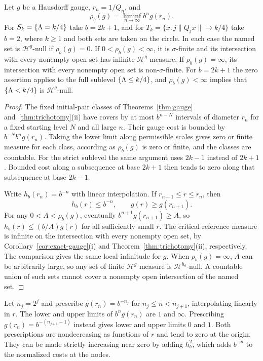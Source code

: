 \begin{corollary}\label{cor:liminf-gauges}
Let $g$ be a Hausdorff gauge, $r_n=1/Q_n$, and
\[
\rho_b(g)=\liminf_{n\to\infty} b^n g(r_n).
\]
For $S_k=\{\Lambda=k/4\}$ take $b=2k+1$, and for
$T_k=\{x:j\|Q_jx\|\to k/4\}$ take $b=2$, where $k\ge1$ and both sets
are taken on the circle. In each case the named set is
$\mathcal H^g$-null if $\rho_b(g)=0$. If $0<\rho_b(g)<\infty$, it is
$\sigma$-finite and its intersection with every nonempty open set has
infinite $\mathcal H^g$ measure. If $\rho_b(g)=\infty$, its intersection
with every nonempty open set is non-$\sigma$-finite. For $b=2k+1$ the
zero assertion applies to the full sublevel $\{\Lambda\le k/4\}$, and
$\rho_b(g)<\infty$ implies that $\{\Lambda<k/4\}$ is $\mathcal H^g$-null.
\end{corollary}

\begin{proof}
The fixed initial-pair classes of Theorems~\ref{thm:gauge}
and~\ref{thm:trichotomy}(ii) have covers by at most $b^{n-N}$ intervals
of diameter $r_n$ for a fixed starting level $N$ and all large $n$.
Their gauge cost is bounded by $b^{-N}b^n g(r_n)$. Taking the lower
limit along permissible scales gives zero or finite measure for each
class, according as $\rho_b(g)$ is zero or finite, and the classes are
countable. For the strict sublevel the same argument uses $2k-1$
instead of $2k+1$. Bounded cost along a subsequence at base $2k+1$
then tends to zero along that subsequence at base $2k-1$.

Write $h_b(r_n)=b^{-n}$ with linear interpolation. If
$r_{n+1}\le r\le r_n$, then
\[
 h_b(r)\le b^{-n},\qquad g(r)\ge g(r_{n+1}).
\]
For any $0<A<\rho_b(g)$, eventually $b^{n+1}g(r_{n+1})\ge A$,
so $h_b(r)\le(b/A)g(r)$ for all sufficiently small $r$. The critical
reference measure is infinite on the intersection with every nonempty
open set, by Corollary~\ref{cor:exact-gauge}(i) and
Theorem~\ref{thm:trichotomy}(ii), respectively. The comparison gives the
same local infinitude for $g$. When $\rho_b(g)=\infty$, $A$ can be
arbitrarily large, so any set of finite $\mathcal H^g$ measure is
$\mathcal H^{h_b}$-null. A countable union of such sets cannot cover
a nonempty open intersection of the named set.
\end{proof}

\begin{remark}
Let $n_j=2^j$ and prescribe $g(r_n)=b^{-n_j}$ for
$n_j\le n<n_{j+1}$, interpolating linearly in $r$. The lower and upper
limits of $b^ng(r_n)$ are $1$ and $\infty$. Prescribing
$g(r_n)=b^{-(n_{j+1}-1)}$ instead gives lower and upper limits $0$ and $1$.
Both prescriptions are nondecreasing as functions of $r$ and tend to zero
at the origin. They can be made strictly increasing near zero by adding
$h_b^2$, which adds $b^{-n}$ to the normalized costs at the nodes.
\end{remark}

